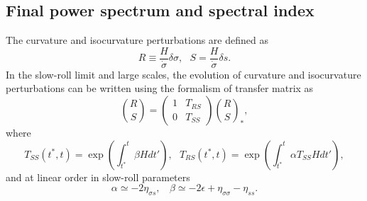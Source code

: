 \documentclass[amssymb,twocolumn,prd,nofootinbib,showpacs]{revtex4-1}
\begin{document}
\subsection{Final power spectrum and spectral index}
The curvature and isocurvature perturbations are defined as
\begin{equation}\label{RS}
R\equiv\frac{H}{\dot\sigma}\delta \sigma, \ \ \ S=\frac{H}{\dot \sigma}\delta s.
\end{equation}
In the slow-roll limit and large scales, the evolution of curvature and isocurvature perturbations can be written using the formalism of transfer matrix as
\begin{equation}
\binom{R }{S}=\begin{pmatrix}1 & T_{RS}\\ 0& T_{SS}\end{pmatrix}\binom{R}{S}_*,
\end{equation}
where
\begin{subequations}
\begin{equation}
T_{SS}(t^*,t)=\exp\left(\int^t_{t^*}\beta Hdt'\right), \ \ \
\end{equation}
\begin{equation}\label{TRS}
T_{RS}(t^*,t)=\exp\left(\int^t_{t^*}\alpha T_{SS}Hdt'\right),
\end{equation}
\end{subequations}
and at linear order in slow-roll parameters
\begin{equation}
\alpha\simeq -2\eta_{\sigma s}, \ \ \ \ \beta\simeq-2\epsilon+\eta_{\sigma\sigma}-\eta_{ss}.
\end{equation}
\end{document}
